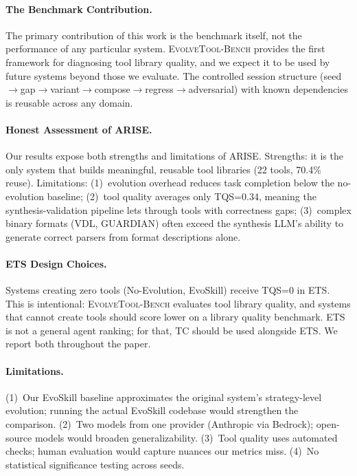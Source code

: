 \documentclass[10pt,twocolumn]{article}
\begin{document}
\paragraph{The Benchmark Contribution.} The primary contribution of this work is the benchmark itself, not the performance of any particular system. \textsc{EvolveTool-Bench} provides the first framework for diagnosing tool library quality, and we expect it to be used by future systems beyond those we evaluate. The controlled session structure (seed$\to$gap$\to$variant$\to$compose$\to$regress$\to$adversarial) with known dependencies is reusable across any domain.

\paragraph{Honest Assessment of ARISE.} Our results expose both strengths and limitations of ARISE. Strengths: it is the only system that builds meaningful, reusable tool libraries (22 tools, 70.4\% reuse). Limitations: (1)~evolution overhead reduces task completion below the no-evolution baseline; (2)~tool quality averages only TQS=0.34, meaning the synthesis-validation pipeline lets through tools with correctness gaps; (3)~complex binary formats (VDL, GUARDIAN) often exceed the synthesis LLM's ability to generate correct parsers from format descriptions alone.

\paragraph{ETS Design Choices.} Systems creating zero tools (No-Evolution, EvoSkill) receive TQS=0 in ETS. This is intentional: \textsc{EvolveTool-Bench} evaluates tool library quality, and systems that cannot create tools should score lower on a library quality benchmark. ETS is not a general agent ranking; for that, TC should be used alongside ETS. We report both throughout the paper.

\paragraph{Limitations.} (1)~Our EvoSkill baseline approximates the original system's strategy-level evolution; running the actual EvoSkill codebase would strengthen the comparison. (2)~Two models from one provider (Anthropic via Bedrock); open-source models would broaden generalizability. (3)~Tool quality uses automated checks; human evaluation would capture nuances our metrics miss. (4)~No statistical significance testing across seeds.
\end{document}
